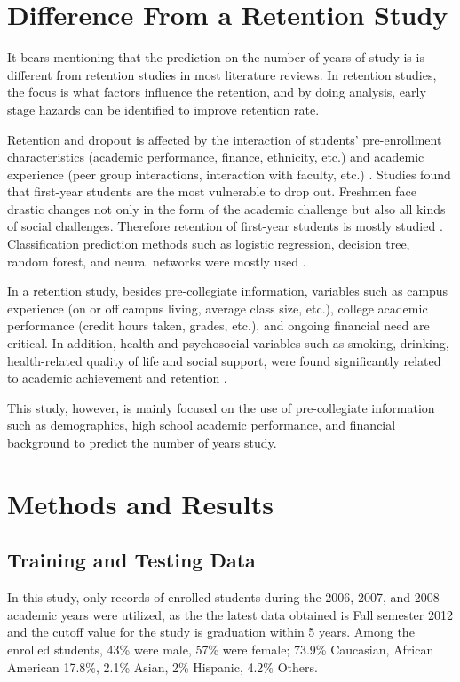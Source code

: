 \documentclass[12pt,english]{report}
\begin{document}
\section{Difference From a Retention Study}
It bears mentioning that the prediction on the number of years of study is is different from retention studies in most literature reviews. In retention studies, the focus is what factors influence the retention, and by doing analysis, early stage hazards can be identified to improve retention rate.

Retention and dropout is affected by the interaction of students' pre-enrollment characteristics (academic performance, finance, ethnicity, etc.) and academic experience (peer group interactions, interaction with faculty, etc.) \citep{Tinto1975, Tinto1982, Terenzini1981}. Studies found that first-year students are the most vulnerable to drop out. Freshmen face drastic changes not only in  the form of the academic challenge but also all kinds of social challenges. Therefore retention of first-year students is mostly studied  \citep{Permzadian2016, Kovacic10earlyprediction, Horstmanshof2007, Noble2007}. Classification prediction methods such as logistic regression, decision tree, random forest, and neural networks were mostly used \citep{dekker2009, AdamGaither2005, quadri2010drop, yu2010data, Herzog2006, Lin2009,zhang2010using, Herzog2006}.

In a retention study, besides  pre-collegiate information, variables such as campus experience (on or off campus living, average class size, etc.), college academic performance (credit hours taken, grades, etc.), and ongoing financial need are critical.  In addition, health and psychosocial variables such as smoking, drinking, health-related quality of life and social support, were found significantly related to  academic achievement and retention \citep{deberard2004predictors, maney1990predicting, musgrave1997personality, cutrona1994perceived}. 

This study, however, is mainly focused on the use of pre-collegiate information such as demographics, high school academic performance, and financial background to predict the number of years study.  

\section{Methods and Results}
\subsection{Training and Testing Data}
In this study, only records of enrolled students  during  the 2006, 2007, and 2008 academic years were utilized, as the the latest data obtained is Fall semester 2012 and the cutoff value for the study is graduation within 5 years.   Among the enrolled students, 43\% were male, 57\% were female;  73.9\% Caucasian, African American 17.8\%,  2.1\% Asian, 2\% Hispanic, 4.2\% Others. 
\end{document}
